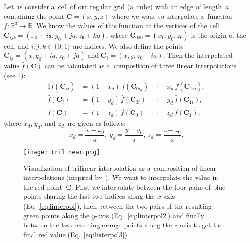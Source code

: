 				Let us consider a~cell of our regular grid (a~cube) with an edge of length~$a$ containing the point $\mathbf{C} = (x,y,z)$ where we want to interpolate a~function $f\colon\mathbb{R}^3\to\mathbb{R}$. We know the values of this function at the vertices of the cell $\mathbf{C}_{ijk} = (x_0+ia,y_0+ja,z_0+ka)$, where $\mathbf{C}_{000} = (x_0,y_0,z_0)$ is the origin of the cell, and $i,j,k \in \{0,1\}$ are indices. We also define the points $\mathbf{C}_{ij} = (x,y_0+ia,z_0+ja)$ and $\mathbf{C}_i=(x,y,z_0+ia)$. Then the interpolated value $\widehat{f}(\mathbf{C})$ can be calculated as a~composition of three linear interpolations (see \cref{fig:trilin}):
					\begin{alignat}{3}
						\label{eq:linterpol}
						\widehat{f}(\mathbf{C}_{ij}) &= (1-x_d)\,f(\mathbf{C}_{0ij}) \,&+&\,x_d\, f(\mathbf{C}_{1ij}),\\
						\label{eq:linterpol2}
						\widehat{f}(\mathbf{C}_{i}) &= (1-y_d)\,\widehat{f}(\mathbf{C}_{0i}) &+&\,y_d\, \widehat{f}(\mathbf{C}_{1i}),\\
						\label{eq:linterpol3}
						\widehat{f}(\mathbf{C}) &= (1-z_d)\,\widehat{f}(\mathbf{C}_0) &+&\,z_d\, \widehat{f}(\mathbf{C}_1),
					\end{alignat}
				where $x_d$, $y_d$, and $z_d$ are given as follows:
					\begin{equation}
						x_d = \frac{x-x_0}{a},~y_d = \frac{y-y_0}{a},~z_d = \frac{z-z_0}{a}.
					\end{equation}
					
				\begin{figure}
					\centering
					\texttt{[image: trilinear.png]}
					\caption{Visualization of trilinear interpolation as a~composition of linear interpolations (inspired by~\cite{trilinear1}). We want to interpolate the value in the red point~$\mathbf{C}$. First we interpolate between the four pairs of blue points sharing the last two indices along the $x$\protect\nobreakdash-axis (Eq.~\ref{eq:linterpol}), then between the two pairs of the resulting green points along the $y$\protect\nobreakdash-axis (Eq.~\ref{eq:linterpol2}) and finally between the two resulting orange points along the $z$\protect\nobreakdash-axis to get the final red value (Eq.~\ref{eq:linterpol3}).}
					\label{fig:trilin}
				\end{figure}
					
